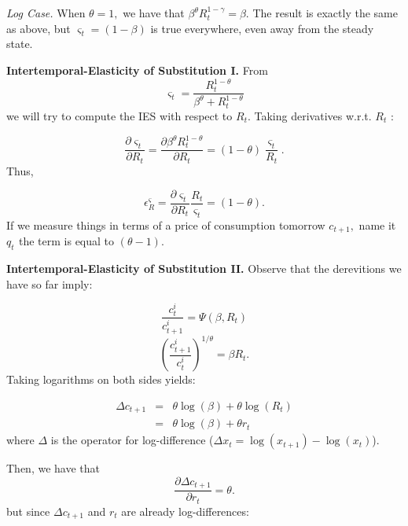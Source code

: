 \documentclass{article}
\begin{document}
\textit{Log Case. }When $\theta =1,$ we have that $\beta ^{\theta
}R_{t}^{1-\gamma }=\beta .$ The result is exactly the same as above, but $%
\varsigma _{t}=\left( 1-\beta \right) $ is true everywhere, even away from
the steady state.

\textbf{Intertemporal-Elasticity of Substitution I. }From
\begin{equation*}
\varsigma _{t}=\frac{R_{t}^{1-\theta }}{\beta ^{\theta }+R_{t}^{1-\theta }}
\end{equation*}%
we will try to compute the IES with respect to $R_{t}.$ Taking derivatives
w.r.t. $R_{t}$ :

\begin{equation*}
\frac{\partial \varsigma _{t}}{\partial R_{t}}=\frac{\partial \beta ^{\theta
}R_{t}^{1-\theta }}{\partial R_{t}}=\left( 1-\theta \right) \frac{\varsigma
_{t}}{R_{t}}.
\end{equation*}%
Thus,

\begin{equation*}
\epsilon _{R}^{\varsigma }=\frac{\partial \varsigma _{t}}{\partial R_{t}}%
\frac{R_{t}}{\varsigma _{t}}=\left( 1-\theta \right) .
\end{equation*}%
If we measure things in terms of a price of consumption tomorrow $c_{t+1},$
name it $q_{t}\,\ $the term is equal to $\left( \theta -1\right) $.

\textbf{Intertemporal-Elasticity of Substitution II. }Observe that the
derevitions we have so far imply:

\begin{equation*}
\frac{c_{t}^{i}}{c_{t+1}^{i}}=\Psi \left( \beta ,R_{t}\right)
\end{equation*}%
\begin{equation*}
\left( \frac{c_{t+1}^{i}}{c_{t}^{i}}\right) ^{1/\theta }=\beta R_{t}.
\end{equation*}%
Taking logarithms on both sides yields:

\begin{eqnarray*}
\Delta c_{t+1} &=&\theta \log \left( \beta \right) +\theta \log (R_{t}) \\
&=&\theta \log \left( \beta \right) +\theta r_{t}
\end{eqnarray*}%
where $\Delta $ is the operator for log-difference ($\Delta x_{t}=\log
\left( x_{t+1}\right) -\log \left( x_{t}\right) $).

Then, we have that
\begin{equation*}
\frac{\partial \Delta c_{t+1}}{\partial r_{t}}=\theta .
\end{equation*}%
but since $\Delta c_{t+1}$ and $r_{t}$ are already log-differences:
\end{document}
